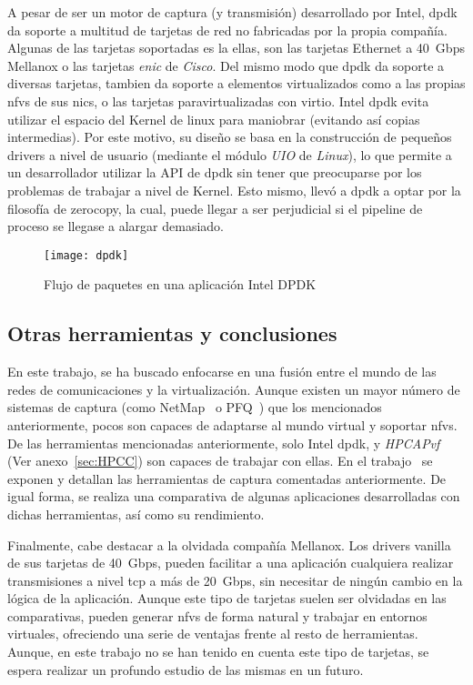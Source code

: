A pesar de ser un motor de captura (y transmisión) desarrollado por Intel, \gls{dpdk} da soporte a multitud de tarjetas de red no fabricadas por la propia compañía. Algunas de las tarjetas soportadas es la ellas, son las tarjetas Ethernet a 40~Gbps Mellanox o las tarjetas \textit{enic} de \textit{Cisco}. Del mismo modo que \gls{dpdk} da soporte a diversas tarjetas, tambien da soporte a elementos virtualizados como a las propias \glspl{nfv} de sus \glspl{nic}, o las tarjetas paravirtualizadas con \gls{virtio}.
Intel \gls{dpdk} evita utilizar el espacio del Kernel de linux para maniobrar (evitando así copias intermedias). Por este motivo, su diseño se basa en la construcción de pequeños drivers a nivel de usuario (mediante el módulo \textit{UIO} de \textit{Linux}), lo que permite a un desarrollador utilizar la API de \gls{dpdk} sin tener que preocuparse por los problemas de trabajar a nivel de Kernel.
Esto mismo, llevó a \gls{dpdk} a optar por la filosofía de \gls{zerocopy}, la cual, puede llegar a ser perjudicial si el pipeline de proceso se llegase a alargar demasiado.


\begin{figure}[!bth]
\centering
\texttt{[image: dpdk]}
\caption{Flujo de paquetes en una aplicación Intel DPDK}
\label{fig:flow:dpdk}
\end{figure}


\subsection{Otras herramientas y conclusiones}

En este trabajo, se ha buscado enfocarse en una fusión entre el mundo de las redes de comunicaciones y la virtualización. Aunque existen un mayor número de sistemas de captura (como NetMap~\cite{rizzo12usenix,rizzo12cacm,rizzoNETWORK14} o PFQ~\cite{bonelli12pam}) que los mencionados anteriormente, pocos son capaces de adaptarse al mundo virtual y soportar \glspl{nfv}. De las herramientas mencionadas anteriormente, solo Intel \gls{dpdk}, y \textit{HPCAPvf} (Ver anexo~\ref{sec:HPCC}) son capaces de trabajar con ellas.
En el trabajo~\cite{7101227} se exponen y detallan las herramientas de captura comentadas anteriormente. De igual forma, se realiza una comparativa de algunas aplicaciones desarrolladas con dichas herramientas, así como su rendimiento.

Finalmente, cabe destacar a la olvidada compañía Mellanox. Los drivers \gls{vanilla} de sus tarjetas de 40~Gbps, pueden facilitar a una aplicación cualquiera realizar transmisiones a nivel tcp a más de 20~Gbps, sin necesitar de ningún cambio en la lógica de la aplicación. Aunque este tipo de tarjetas suelen ser olvidadas en las comparativas, pueden generar \glspl{nfv} de forma natural y trabajar en entornos virtuales, ofreciendo una serie de ventajas frente al resto de herramientas. Aunque, en este trabajo no se han tenido en cuenta este tipo de tarjetas, se espera realizar un profundo estudio de las mismas en un futuro.



